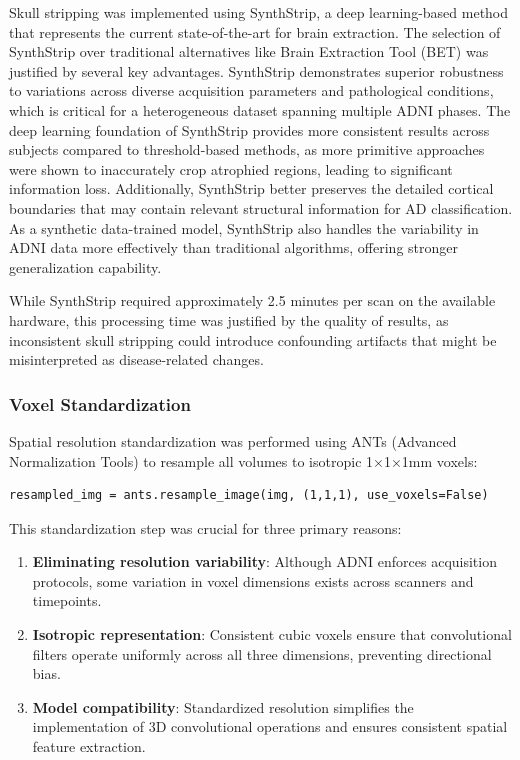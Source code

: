 \documentclass[12pt, a4paper]{article}
\begin{document}
Skull stripping was implemented using SynthStrip, a deep learning-based method that represents the current state-of-the-art for brain extraction. The selection of SynthStrip over traditional alternatives like Brain Extraction Tool (BET) was justified by several key advantages. SynthStrip demonstrates superior robustness to variations across diverse acquisition parameters and pathological conditions, which is critical for a heterogeneous dataset spanning multiple ADNI phases. The deep learning foundation of SynthStrip provides more consistent results across subjects compared to threshold-based methods, as more primitive approaches were shown to inaccurately crop atrophied regions, leading to significant information loss. Additionally, SynthStrip better preserves the detailed cortical boundaries that may contain relevant structural information for AD classification. As a synthetic data-trained model, SynthStrip also handles the variability in ADNI data more effectively than traditional algorithms, offering stronger generalization capability.

While SynthStrip required approximately 2.5 minutes per scan on the available hardware, this processing time was justified by the quality of results, as inconsistent skull stripping could introduce confounding artifacts that might be misinterpreted as disease-related changes.

\subsubsection{Voxel Standardization}

Spatial resolution standardization was performed using ANTs (Advanced Normalization Tools) to resample all volumes to isotropic 1$\times$1$\times$1mm voxels:

\begin{verbatim}
resampled_img = ants.resample_image(img, (1,1,1), use_voxels=False)
\end{verbatim}

This standardization step was crucial for three primary reasons:

\begin{enumerate}
    \item \textbf{Eliminating resolution variability}: Although ADNI enforces acquisition protocols, some variation in voxel dimensions exists across scanners and timepoints.
    
    \item \textbf{Isotropic representation}: Consistent cubic voxels ensure that convolutional filters operate uniformly across all three dimensions, preventing directional bias.
    
    \item \textbf{Model compatibility}: Standardized resolution simplifies the implementation of 3D convolutional operations and ensures consistent spatial feature extraction.
\end{enumerate}
\end{document}
